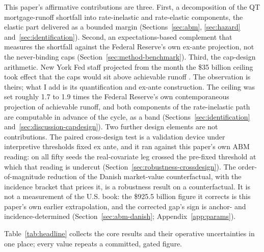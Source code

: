 \documentclass[12pt]{article}
\begin{document}
This paper's affirmative contributions are three. First, a decomposition of the QT mortgage-runoff shortfall into rate-inelastic and rate-elastic components, the elastic part delivered as a bounded margin (Sections~\ref{sec:abm}, \ref{sec:hazard} and~\ref{sec:identification}). Second, an expectations-based complement that measures the shortfall against the Federal Reserve's own ex-ante projection, not the never-binding caps (Section~\ref{sec:method-benchmark}). Third, the cap-design arithmetic. New York Fed staff projected from the month the \$35 billion ceiling took effect that the caps would sit above achievable runoff \citep{nyfed2022}. The observation is theirs; what I add is its quantification and ex-ante construction. The ceiling was set roughly 1.7 to 1.9 times the Federal Reserve's own contemporaneous projection of achievable runoff, and both components of the rate-inelastic path are computable in advance of the cycle, as a band (Sections~\ref{sec:identification} and~\ref{sec:discussion-capdesign}). Two further design elements are not contributions. The paired cross-design test is a validation device under interpretive thresholds fixed ex ante, and it ran against this paper's own ABM reading: on all fifty seeds the real-covariate leg crossed the pre-fixed threshold at which that reading is undercut (Section~\ref{sec:robustness-crossdesign}). The order-of-magnitude reduction of the Danish market-value counterfactual, with the incidence bracket that prices it, is a robustness result on a counterfactual. It is not a measurement of the U.S. book: the \$925.5 billion figure it corrects is this paper's own earlier extrapolation, and the corrected gap's sign is anchor- and incidence-determined (Section~\ref{sec:abm-danish}; Appendix~\ref{app:params}).

Table~\ref{tab:headline} collects the core results and their operative uncertainties in one place; every value repeats a committed, gated figure.
\end{document}

